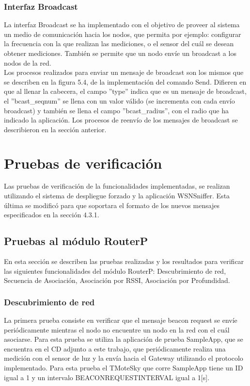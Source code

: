 \subsubsection{Interfaz Broadcast}
La interfaz Broadcast se ha implementado con el objetivo de proveer al sistema un medio de comunicación hacia los nodos, que permita por ejemplo: configurar la frecuencia con la que realizan las mediciones, o el sensor del cuál se desean obtener mediciones. También se permite que un nodo envíe un broadcast a los nodos de la red. \\

Los procesos realizados para enviar un mensaje de broadcast son los mismos que se describen en la figura 5.4, de la implementación del comando Send. Difieren en que al llenar la cabecera, el campo ''type'' indica que es un mensaje de broadcast, el ''bcast\_seqnum'' se llena con un valor válido (se incrementa con cada envío broadcast) y también se llena el campo ''bcast\_radius'', con el radio que ha indicado la aplicación. Los procesos de reenvío de los mensajes de broadcast se describieron en la sección anterior.

\section{Pruebas de verificación}
Las pruebas de verificación de la funcionalidades implementadas, se realizan utilizando el sistema de despliegue forzado y la aplicación WSNSniffer. Esta última se modificó para que soportara el formato de los nuevos mensajes especificados en la sección 4.3.1.
 
\subsection{Pruebas al módulo RouterP}
En esta sección se describen las pruebas realizadas y los resultados para verificar las siguientes funcionalidades del módulo RouterP: Descubrimiento de red, Secuencia de Asociación, Asociación por RSSI, Asociación por Profundidad.

\subsubsection{Descubrimiento de red}
La primera prueba consiste en verificar que el mensaje beacon request se envíe periódicamente mientras el nodo no encuentre un nodo en la red con el cuál asociarse. Para esta prueba se utiliza la aplicación de prueba SampleApp, que se encuentra en el CD adjunto a este trabajo, que periódicamente realiza una medición con el sensor de luz y la envía hacia el Gateway utilizando el protocolo implementado. Para esta prueba el TMoteSky que corre SampleApp tiene un ID igual a 1 y un intervalo BEACON\textunderscore REQUEST\textunderscore INTERVAL igual a 1[s].

